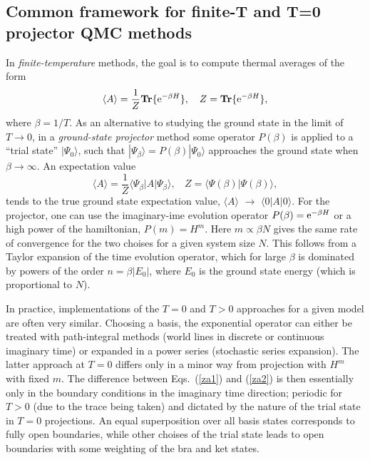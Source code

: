 \documentclass[aps,prb,groupedaddress,twocolumn]{revtex4}
\begin{document}
\subsection{Common framework for finite-T and T=0 projector QMC methods}
\label{ss:method}

In {\it finite-temperature} methods, the goal is to compute thermal averages of the form
\begin{equation}
\langle A\rangle = \frac{1}{Z}{\bf Tr}\{ {\rm e}^{-\beta H}\},~~~
Z = {\bf Tr}\{ {\rm e}^{-\beta H}\},
\label{za1}
\end{equation}
where $\beta=1/T$. As an alternative to studying the ground state in the limit of  $T\to 0$, in a {\it ground-state projector} method some 
operator $P(\beta)$  is applied to a ``trial state'' $|\Psi_0\rangle$, such that $|\Psi_\beta \rangle = P(\beta)|\Psi_0\rangle$ approaches the 
ground state when $\beta \to \infty$. An expectation value
\begin{equation}
\langle A\rangle = \frac{1}{Z}\langle \Psi_\beta|A|\Psi_\beta\rangle,~~~~ Z = \langle \Psi(\beta)|\Psi(\beta)\rangle,
\label{za2}
\end{equation}
tends to the true ground state expectation value, $\langle A\rangle$ $\to$ $\langle 0| A|0\rangle$. For the projector, one can use the imaginary-ime
evolution operator $P(\beta)={\rm e}^{-\beta H}$ or a high power of the hamiltonian, $P(m)=H^m$. Here $m \propto \beta N$ gives the same rate of 
convergence for the two choises for a given system size $N$. This follows from a Taylor expansion of the time evolution operator, which for large 
$\beta$ is dominated by powers of the order $n=\beta |E_0|$, where $E_0$ is the ground state energy (which is proportional to $N$).

In practice, implementations of the $T=0$ and $T>0$ approaches for a given model are often very similar. Choosing a basis, the exponential
operator can either be treated with path-integral methods (world lines in discrete or continuous imaginary time) or expanded in a power series 
(stochastic series expansion). The latter approach at $T=0$ differs only in a minor way from projection with $H^m$ with fixed $m$. The difference 
between Eqs.~(\ref{za1}) and (\ref{za2}) is then essentially only in the boundary conditions in the imaginary time direction; periodic for $T>0$ 
(due to the trace being taken) and dictated by the nature of the trial state in $T=0$ projections. An equal superposition over all basis states 
corresponds to fully open boundaries, while other choises of the trial state leads to open boundaries with some weighting of the bra and ket states. 
\end{document}
